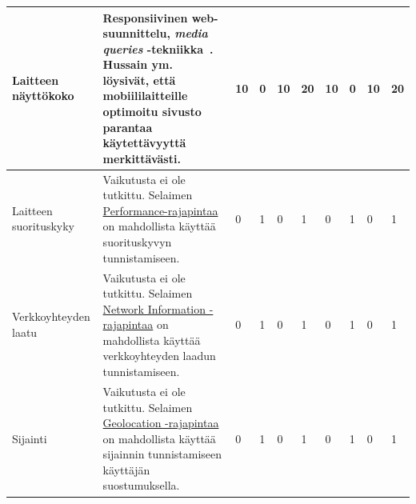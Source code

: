 \documentclass[finnish, 12pt, a4paper, elec, utf8, a-1b, online]{aaltothesis}
\begin{document}
{\begin{longtable}{p{2.5cm}|p{6cm}|p{0.5cm}p{0.5cm}p{0.5cm}|p{0.5cm}|p{0.5cm}p{0.5cm}p{0.5cm}|p{0.5cm}|}
    \midrule
    Laitteen näyttökoko                    & Responsiivinen web-suunnittelu, \textit{media queries} -tekniikka~\cite{Rivoal:12:MQ}. Hussain ym.~\cite{WOS:000218608600006} löysivät, että mobiililaitteille optimoitu sivusto parantaa käytettävyyttä merkittävästi.                                                                                                                 & 10                                         & 0                                   & 10                                     & 20                           & 10                                              & 0                                         & 10                                        & 20                           \\
    \midrule
    Laitteen suorituskyky                  & Vaikutusta ei ole tutkittu. Selaimen \href{https://developer.mozilla.org/en-US/docs/Web/API/Performance}{Performance-rajapintaa} on mahdollista käyttää suorituskyvyn tunnistamiseen.                                                                                                                                                   & 0                                          & 1                                   & 0                                      & 1                            & 0                                               & 1                                         & 0                                         & 1                            \\
    \midrule
    Verkkoyhteyden laatu                   & Vaikutusta ei ole tutkittu. Selaimen \href{https://developer.mozilla.org/en-US/docs/Web/API/Network_Information_API}{Network Information -rajapintaa} on mahdollista käyttää verkkoyhteyden laadun tunnistamiseen.                                                                                                                      & 0                                          & 1                                   & 0                                      & 1                            & 0                                               & 1                                         & 0                                         & 1                            \\
    \midrule
    Sijainti                               & Vaikutusta ei ole tutkittu. Selaimen \href{https://developer.mozilla.org/en-US/docs/Web/API/Geolocation_API}{Geolocation -rajapintaa} on mahdollista käyttää sijainnin tunnistamiseen käyttäjän suostumuksella.                                                                                                                         & 0                                          & 1                                   & 0                                      & 1                            & 0                                               & 1                                         & 0                                         & 1                            \\

\end{longtable}}
\end{document}
